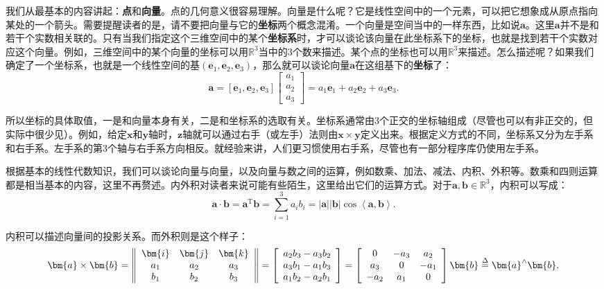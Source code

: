 我们从最基本的内容讲起：\textbf{点}和\textbf{向量}。点的几何意义很容易理解。向量是什么呢？它是线性空间中的一个元素，可以把它想象成从原点指向某处的一个箭头。需要提醒读者的是，请不要把向量与它的\textbf{坐标}两个概念混淆。一个向量是空间当中的一样东西，比如说$\bm{a}$。这里$\bm{a}$并不是和若干个实数相关联的。只有当我们指定这个三维空间中的某个\textbf{坐标系}时，才可以谈论该向量在此坐标系下的坐标，也就是找到若干个实数对应这个向量。例如，三维空间中的某个向量的坐标可以用$\mathbb{R}^3$当中的3个数来描述。某个点的坐标也可以用$\mathbb{R}^3$来描述。怎么描述呢？如果我们确定了一个坐标系，也就是一个线性空间的基$(\bm{e}_1,\bm{e}_2,\bm{e}_3)$，那么就可以谈论向量$\bm{a}$在这组基下的\textbf{坐标}了：
\begin{equation}
\bm{a} = \left[ {{\bm{e}_1},{\bm{e}_2},{\bm{e}_3}} \right]\left[ \begin{array}{l}
{a_1}\\
{a_2}\\
{a_3}
\end{array} \right] = {a_1}{\bm{e}_1} + {a_2}{\bm{e}_2} + {a_3}{\bm{e}_3}.
\end{equation}

所以坐标的具体取值，一是和向量本身有关，二是和坐标系的选取有关。坐标系通常由3个正交的坐标轴组成（尽管也可以有非正交的，但实际中很少见）。例如，给定$\bm{x}$和$\bm{y}$轴时，$\bm{z}$轴就可以通过右手（或左手）法则由$\bm{x} \times \bm{y}$定义出来。根据定义方式的不同，坐标系又分为左手系和右手系。左手系的第3个轴与右手系方向相反。就经验来讲，人们更习惯使用右手系，尽管也有一部分程序库仍使用左手系。

根据基本的线性代数知识，我们可以谈论向量与向量，以及向量与数之间的运算，例如数乘、加法、减法、内积、外积等。数乘和四则运算都是相当基本的内容，这里不再赘述。内外积对读者来说可能有些陌生，这里给出它们的运算方式。对于$\bm{a}, \bm{b} \in \mathbb{R}^3$，内积可以写成：
\begin{equation}
\bm{a} \cdot \bm{b} = { \bm{a}^\mathrm{T}}\bm{b} = \sum\limits_{i = 1}^3 {{a_i}{b_i}}  = \left| \bm{a} \right|\left| \bm{b} \right|\cos \left\langle {\bm{a},\bm{b}} \right\rangle .
\end{equation}

内积可以描述向量间的投影关系。而外积则是这个样子：
\begin{equation}
\label{eq:cross}
\bm{a} \times \bm{b} = \left\| {\begin{array}{*{20}{c}}
	\bm{i} & \bm{j} & \bm{k} \\
	{{a_1}}&{{a_2}}&{{a_3}}\\
	{{b_1}}&{{b_2}}&{{b_3}}
	\end{array}} \right\| = \left[ \begin{array}{l}
{a_2}{b_3} - {a_3}{b_2}\\
{a_3}{b_1} - {a_1}{b_3}\\
{a_1}{b_2} - {a_2}{b_1}
\end{array} \right] = \left[ {\begin{array}{*{20}{c}}
	0&{ - {a_3}}&{{a_2}}\\
	{{a_3}}&0&{ - {a_1}}\\
	{ - {a_2}}&{{a_1}}&0
	\end{array}} \right] \bm{b} \buildrel \Delta \over = { \bm{a}^ \wedge } \bm{b}.
\end{equation}

